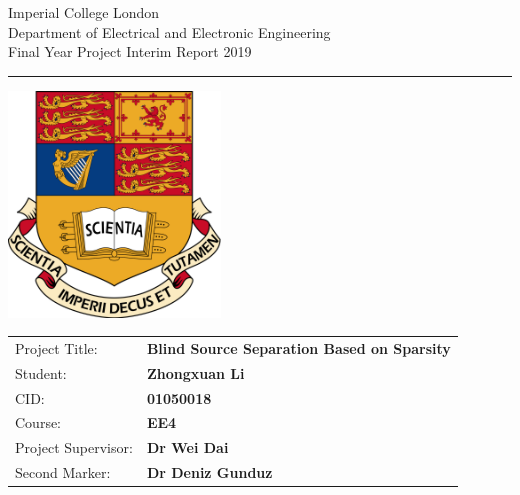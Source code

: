 \begin{titlepage}
                \setlength{\parindent}{0pt}
                \setlength{\parskip}{0pt}

                {
                                \Large
                                \raggedright
                                Imperial College London\\[17pt]
                                Department of Electrical and Electronic Engineering\\[17pt]
                                Final Year Project Interim Report 2019\\[17pt]
 
                }

                \rule{\columnwidth}{3pt}
                \vfill
                \centering
                  \includegraphics[width=0.7\columnwidth,height=60mm,keepaspectratio]{figures/ic.png}
                \vfill
                \setlength{\tabcolsep}{0pt}

                \begin{tabular}{p{40mm}p{\dimexpr\columnwidth-40mm}}
                                Project Title: & \textbf{Blind Source Separation Based on Sparsity} \\[12pt]
                                Student: & \textbf{Zhongxuan Li} \\[12pt]
                                CID: & \textbf{01050018} \\[12pt]
                                Course: & \textbf{EE4} \\[12pt]
                                Project Supervisor: & \textbf{Dr Wei Dai} \\[12pt]
                                Second Marker: & \textbf{Dr Deniz Gunduz} \\
                \end{tabular}
\end{titlepage}